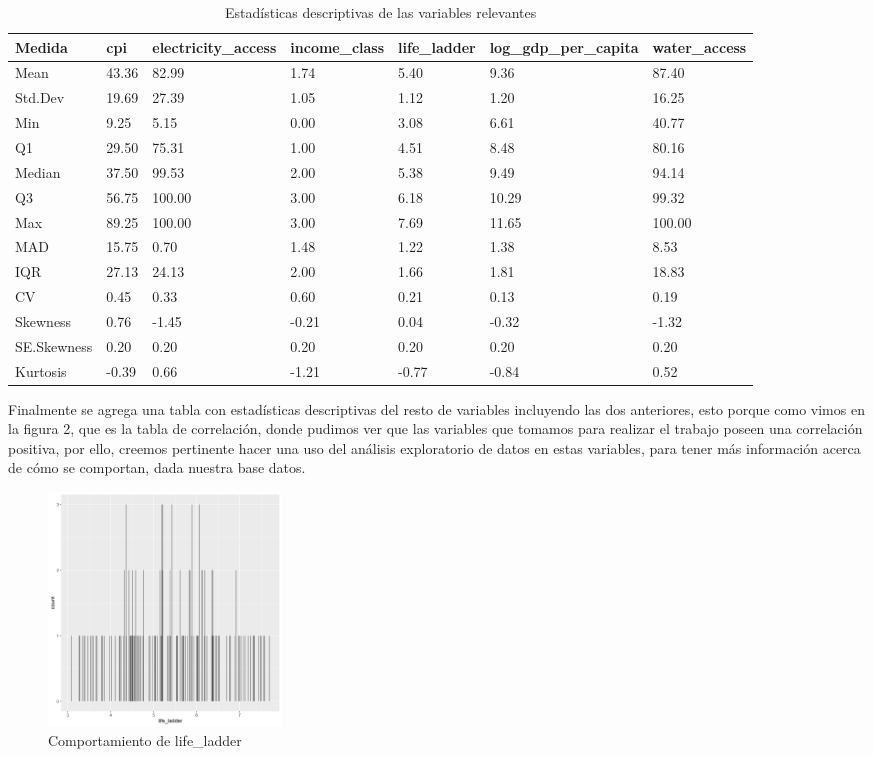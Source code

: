 \begin{table}[!ht]
\caption{Estadísticas descriptivas de las variables relevantes}
\scriptsize
    \centering
    \begin{tabular}{|l|l|l|l|l|l|l|}
    \hline
        Medida & cpi & electricity\_access & income\_class & life\_ladder & log\_gdp\_per\_capita & water\_access \\ \hline
        Mean & 43.36 & 82.99 & 1.74 & 5.40 & 9.36 & 87.40 \\ \hline
        Std.Dev & 19.69 & 27.39 & 1.05 & 1.12 & 1.20 & 16.25 \\ \hline
        Min & 9.25 & 5.15 & 0.00 & 3.08 & 6.61 & 40.77 \\ \hline
        Q1 & 29.50 & 75.31 & 1.00 & 4.51 & 8.48 & 80.16 \\ \hline
        Median & 37.50 & 99.53 & 2.00 & 5.38 & 9.49 & 94.14 \\ \hline
        Q3 & 56.75 & 100.00 & 3.00 & 6.18 & 10.29 & 99.32 \\ \hline
        Max & 89.25 & 100.00 & 3.00 & 7.69 & 11.65 & 100.00 \\ \hline
        MAD & 15.75 & 0.70 & 1.48 & 1.22 & 1.38 & 8.53 \\ \hline
        IQR & 27.13 & 24.13 & 2.00 & 1.66 & 1.81 & 18.83 \\ \hline
        CV & 0.45 & 0.33 & 0.60 & 0.21 & 0.13 & 0.19 \\ \hline
        Skewness & 0.76 & -1.45 & -0.21 & 0.04 & -0.32 & -1.32 \\ \hline
        SE.Skewness & 0.20 & 0.20 & 0.20 & 0.20 & 0.20 & 0.20 \\ \hline
        Kurtosis & -0.39 & 0.66 & -1.21 & -0.77 & -0.84 & 0.52 \\ \hline
    \end{tabular}
\end{table}


Finalmente se agrega una tabla con estadísticas descriptivas del resto de variables incluyendo las dos anteriores, esto porque como vimos en la figura 2, que es la tabla de correlación, donde pudimos ver que las variables que tomamos para realizar el trabajo poseen una correlación positiva, por ello, creemos pertinente hacer una uso del análisis exploratorio de datos en estas variables, para tener más información acerca de cómo se comportan, dada nuestra base datos.



\begin{figure}[!ht]
    \centering
    \includegraphics[width=0.3\textwidth]{figures/life_variacion.png}
    \caption{Comportamiento de life\_ladder}
    \label{fig:correlaciones1}
\end{figure}

